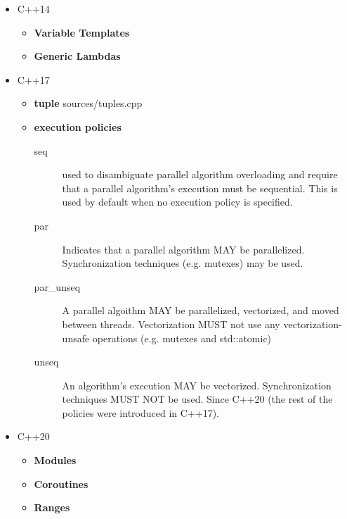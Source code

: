 \documentclass{article}
\begin{document}
\begin{itemize}
      \item C++14
        \begin{itemize}
          \item \textbf{Variable Templates}
          \item \textbf{Generic Lambdas}
        \end{itemize}
      \item C++17
        \begin{itemize}
          \item \textbf{tuple}
             {sources/tuples.cpp}
          \item \textbf{execution policies}
            \begin{description}
              \item[seq]
                used to disambiguate parallel algorithm overloading and require that a parallel algorithm's execution must be sequential. This is used by default when no execution policy is specified.
            \end{description}
            \begin{description}
              \item[par]
                Indicates that a parallel algorithm MAY be parallelized. Synchronization techniques (e.g. mutexes) may be used.
            \end{description}
            \begin{description}
              \item[par\_unseq]
                A parallel algoithm MAY be parallelized, vectorized, and moved between threads. Vectorization MUST not use any vectorization-unsafe operations (e.g. mutexes and std::atomic)
            \end{description}
            \begin{description}
              \item[unseq]
                An algorithm's execution MAY be vectorized. Synchronization techniques MUST NOT be used. Since C++20 (the rest of the policies were introduced in C++17).
            \end{description}
        \end{itemize}
      \item C++20
        \begin{itemize}
          \item \textbf{Modules}
          \item \textbf{Coroutines}
          \item \textbf{Ranges} \\

\end{itemize}
\end{itemize}
\end{document}
